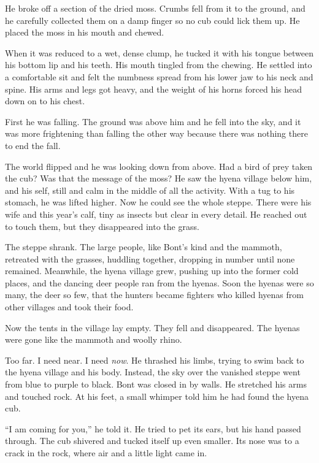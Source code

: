 He broke off a section of the dried moss. Crumbs fell from it to the ground, and he carefully collected them on a damp finger so no cub could lick them up. He placed the moss in his mouth and chewed.

When it was reduced to a wet, dense clump, he tucked it with his tongue between his bottom lip and his teeth. His mouth tingled from the chewing. He settled into a comfortable sit and felt the numbness spread from his lower jaw to his neck and spine. His arms and legs got heavy, and the weight of his horns forced his head down on to his chest.

First he was falling. The ground was above him and he fell into the sky, and it was more frightening than falling the other way because there was nothing there to end the fall.

The world flipped and he was looking down from above. Had a bird of prey taken the cub? Was that the message of the moss? He saw the hyena village below him, and his self, still and calm in the middle of all the activity. With a tug to his stomach, he was lifted higher. Now he could see the whole steppe. There were his wife and this year's calf, tiny as insects but clear in every detail. He reached out to touch them, but they disappeared into the grass.

The steppe shrank. The large people, like Bont's kind and the mammoth, retreated with the grasses, huddling together, dropping in number until none remained. Meanwhile, the hyena village grew, pushing up into the former cold places, and the dancing deer people ran from the hyenas. Soon the hyenas were so many, the deer so few, that the hunters became fighters who killed hyenas from other villages and took their food.

Now the tents in the village lay empty. They fell and disappeared. The hyenas were gone like the mammoth and woolly rhino.

Too far. I need near. I need \emph{now}. He thrashed his limbs, trying to swim back to the hyena village and his body. Instead, the sky over the vanished steppe went from blue to purple to black. Bont was closed in by walls. He stretched his arms and touched rock. At his feet, a small whimper told him he had found the hyena cub.

``I am coming for you,'' he told it. He tried to pet its ears, but his hand passed through. The cub shivered and tucked itself up even smaller. Its nose was to a crack in the rock, where air and a little light came in.

